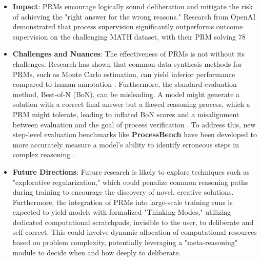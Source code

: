 \documentclass{article}
\begin{document}
\begin{itemize}
    \item \textbf{Impact}: PRMs encourage logically sound deliberation and mitigate the risk of achieving the "right answer for the wrong reasons." Research from OpenAI demonstrated that process supervision significantly outperforms outcome supervision on the challenging MATH dataset, with their PRM solving 78%
    \item \textbf{Challenges and Nuances}: The effectiveness of PRMs is not without its challenges. Research has shown that common data synthesis methods for PRMs, such as Monte Carlo estimation, can yield inferior performance compared to human annotation \cite{mondorf2024beyond}. Furthermore, the standard evaluation method, Best-of-N (BoN), can be misleading. A model might generate a solution with a correct final answer but a flawed reasoning process, which a PRM might tolerate, leading to inflated BoN scores and a misalignment between evaluation and the goal of process verification \cite{mondorf2024beyond}. To address this, new step-level evaluation benchmarks like \textbf{ProcessBench} have been developed to more accurately measure a model's ability to identify erroneous steps in complex reasoning \cite{processbench}.
    \item \textbf{Future Directions}: Future research is likely to explore techniques such as "explorative regularization," which could penalize common reasoning paths during training to encourage the discovery of novel, creative solutions. Furthermore, the integration of PRMs into large-scale training runs is expected to yield models with formalized "Thinking Modes," utilizing dedicated computational scratchpads, invisible to the user, to deliberate and self-correct. This could involve dynamic allocation of computational resources based on problem complexity, potentially leveraging a "meta-reasoning" module to decide when and how deeply to deliberate.
\end{itemize}
\end{document}
